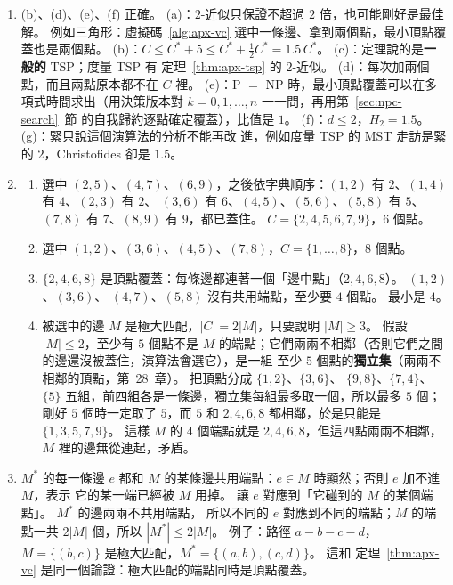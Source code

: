 \begin{enumerate}
\item (b)、(d)、(e)、(f) 正確。 (a)：$2$-近似只保證不超過 $2$ 倍，也可能剛好是最佳解。 例如三角形：虛擬碼~\ref{alg:apx-vc}
選中一條邊、拿到兩個點，最小頂點覆蓋也是兩個點。 (b)：$C \le C^* + 5
\le C^* + \frac12 C^* = 1.5\, C^*$。 (c)：定理說的是\textbf{一般的} TSP；度量 TSP 有
定理~\ref{thm:apx-tsp} 的 $2$-近似。 (d)：每次加兩個點，而且兩點原本都不在 $C$ 裡。 (e)：P $=$ NP
時，最小頂點覆蓋可以在多項式時間求出（用決策版本對 $k = 0, 1, \ldots, n$ 一一問，再用第~\ref{sec:npc-search}~節
的自我歸約逐點確定覆蓋），比值是 $1$。 (f)：$d \le 2$，$H_2 = 1.5$。 (g)：緊只說這個演算法的分析不能再改
進，例如度量 TSP 的 MST 走訪是緊的 $2$，Christofides 卻是 $1.5$。

\item
\begin{enumerate}
\item 選中 $(2,5)$、$(4,7)$、$(6,9)$，之後依字典順序：$(1,2)$ 有 $2$、$(1,4)$ 有 $4$、$(2,3)$ 有 $2$、
$(3,6)$ 有 $6$、$(4,5)$、$(5,6)$、$(5,8)$ 有 $5$、$(7,8)$ 有 $7$、$(8,9)$ 有 $9$，都已蓋住。
$C = \{2, 4, 5, 6, 7, 9\}$，$6$ 個點。
\item 選中 $(1,2)$、$(3,6)$、$(4,5)$、$(7,8)$，$C = \{1, \ldots, 8\}$，$8$ 個點。
\item $\{2, 4, 6, 8\}$ 是頂點覆蓋：每條邊都連著一個「邊中點」（$2, 4, 6, 8$）。 $(1,2)$、$(3,6)$、
$(4,7)$、$(5,8)$ 沒有共用端點，至少要 $4$ 個點。 最小是 $4$。
\item 被選中的邊 $M$ 是極大匹配，$|C| = 2|M|$，只要說明 $|M| \ge 3$。 假設 $|M| \le 2$，至少有
$5$ 個點不是 $M$ 的端點；它們兩兩不相鄰（否則它們之間的邊還沒被蓋住，演算法會選它），是一組
至少 $5$ 個點的\textbf{獨立集}（兩兩不相鄰的頂點，第~28~章）。 把頂點分成 $\{1,2\}$、$\{3,6\}$、
$\{9,8\}$、$\{7,4\}$、$\{5\}$ 五組，前四組各是一條邊，獨立集每組最多取一個，所以最多 $5$ 個；
剛好 $5$ 個時一定取了 $5$，而 $5$ 和 $2, 4, 6, 8$ 都相鄰，於是只能是 $\{1, 3, 5, 7, 9\}$。 這樣
$M$ 的 $4$ 個端點就是 $2, 4, 6, 8$，但這四點兩兩不相鄰，$M$ 裡的邊無從連起，矛盾。
\end{enumerate}

\item $M^*$ 的每一條邊 $e$ 都和 $M$ 的某條邊共用端點：$e \in M$ 時顯然；否則 $e$ 加不進 $M$，表示
它的某一端已經被 $M$ 用掉。 讓 $e$ 對應到「它碰到的 $M$ 的某個端點」。 $M^*$ 的邊兩兩不共用端點，
所以不同的 $e$ 對應到不同的端點；$M$ 的端點一共 $2|M|$ 個，所以 $|M^*| \le 2|M|$。 例子：路徑
$a - b - c - d$，$M = \{(b, c)\}$ 是極大匹配，$M^* = \{(a, b), (c, d)\}$。 這和
定理~\ref{thm:apx-vc} 是同一個論證：極大匹配的端點同時是頂點覆蓋。


\end{enumerate}
